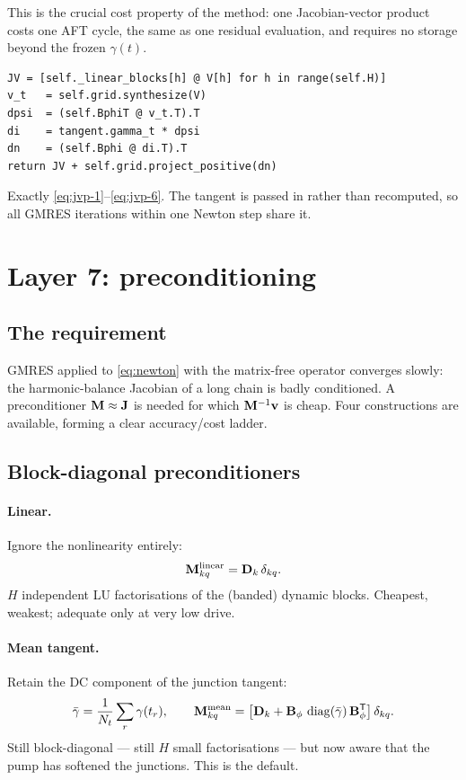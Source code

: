 This is the crucial cost property of the method: one Jacobian-vector product
costs one AFT cycle, the same as one residual evaluation, and requires no
storage beyond the frozen $\gamma(t)$.

\begin{implnote}
\begin{lstlisting}
JV = [self._linear_blocks[h] @ V[h] for h in range(self.H)]
v_t   = self.grid.synthesize(V)
dpsi  = (self.BphiT @ v_t.T).T
di    = tangent.gamma_t * dpsi
dn    = (self.Bphi @ di.T).T
return JV + self.grid.project_positive(dn)
\end{lstlisting}
Exactly \eqref{eq:jvp-1}--\eqref{eq:jvp-6}. The tangent is passed in rather than
recomputed, so all GMRES iterations within one Newton step share it.
\end{implnote}

\section{Layer 7: preconditioning}
\label{sec:precond}

\subsection{The requirement}

GMRES applied to \eqref{eq:newton} with the matrix-free operator converges
slowly: the harmonic-balance Jacobian of a long chain is badly conditioned. A
preconditioner $\mathbf{M}\approx\mathbf{J}$ is needed for which $\mathbf{M}^{-1}\mathbf{v}$ is
cheap. Four constructions are available, forming a clear accuracy/cost ladder.

\subsection{Block-diagonal preconditioners}

\paragraph{Linear.} Ignore the nonlinearity entirely:
\begin{equation}
  \mathbf{M}^{\mathrm{linear}}_{kq} = \mathbf{D}_k\,\delta_{kq}.
  \label{eq:precond-linear}
\end{equation}
$H$ independent LU factorisations of the (banded) dynamic blocks. Cheapest,
weakest; adequate only at very low drive.

\paragraph{Mean tangent.} Retain the DC component of the junction tangent:
\begin{equation}
  \bar{\gamma} = \frac{1}{N_t}\sum_r \gamma(t_r),
  \qquad
  \mathbf{M}^{\mathrm{mean}}_{kq}
  = \left[\mathbf{D}_k + \mathbf{B}_{\phi}\,\operatorname{diag}(\bar\gamma)\,\mathbf{B}_{\phi}^{\mathsf T}\right]\delta_{kq}.
  \label{eq:precond-mean}
\end{equation}
Still block-diagonal --- still $H$ small factorisations --- but now aware that
the pump has softened the junctions. This is the default.

